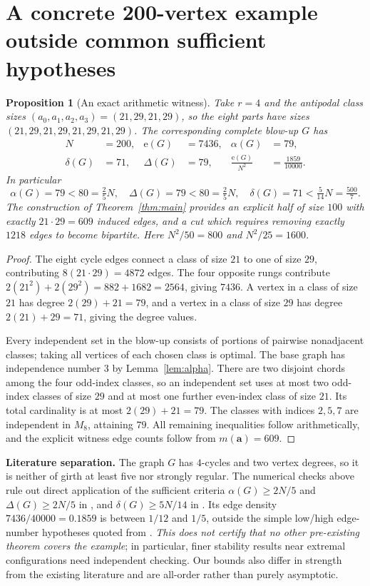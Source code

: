 \documentclass[11pt,a4paper]{article}
\newtheorem{proposition}[theorem]{Proposition}
\newcommand{\edges}{\mathrm e}
\begin{document}
\section{A concrete 200-vertex example outside common sufficient hypotheses}
\begin{proposition}[An exact arithmetic witness]\label{prop:200}
Take $r=4$ and the antipodal class sizes $(a_0,a_1,a_2,a_3)=(21,29,21,29)$, so the eight parts have sizes
$(21,29,21,29,21,29,21,29)$. The corresponding complete blow-up $G$ has
\begin{align*}
 N&=200,&\edges(G)&=7436, &\alpha(G)&=79,\\
 \delta(G)&=71, &\Delta(G)&=79, &\frac{\edges(G)}{N^2}&=\frac{1859}{10000}.
\end{align*}
In particular
\[
 \alpha(G)=79<80=\tfrac25N,\quad
 \Delta(G)=79<80=\tfrac25N,\quad
 \delta(G)=71<\tfrac5{14}N=\tfrac{500}{7}.
\]
The construction of Theorem~\ref{thm:main} provides an explicit half of size $100$ with \emph{exactly $21\cdot29=609$ induced edges}, and a cut which requires removing exactly $1218$ edges to become bipartite. Here $N^2/50=800$ and $N^2/25=1600$.
\end{proposition}
\begin{proof}
The eight cycle edges connect a class of size $21$ to one of size $29$, contributing $8(21\cdot29)=4872$ edges. The four opposite rungs contribute $2(21^2)+2(29^2)=882+1682=2564$, giving $7436$. A vertex in a class of size $21$ has degree $2(29)+21=79$, and a vertex in a class of size $29$ has degree $2(21)+29=71$, giving the degree values.

Every independent set in the blow-up consists of portions of pairwise nonadjacent classes; taking all vertices of each chosen class is optimal. The base graph has independence number $3$ by Lemma~\ref{lem:alpha}. There are two disjoint chords among the four odd-index classes, so an independent set uses at most two odd-index classes of size $29$ and at most one further even-index class of size $21$. Its total cardinality is at most $2(29)+21=79$. The classes with indices $2,5,7$ are independent in $M_8$, attaining $79$. All remaining inequalities follow arithmetically, and the explicit witness edge counts follow from $m(\mathbf a)=609$.
\end{proof}
\noindent\textbf{Literature separation.} The graph $G$ has $4$-cycles and two vertex degrees, so it is neither of girth at least five nor strongly regular. The numerical checks above rule out direct application of the sufficient criteria $\alpha(G)\ge2N/5$ and $\Delta(G)\ge2N/5$ in \cite{Raz2022}, and $\delta(G)\ge5N/14$ in \cite{NorYep2015}. Its edge density $7436/40000=0.1859$ is between $1/12$ and $1/5$, outside the simple low/high edge-number hypotheses quoted from \cite{KeeSud2006}. \emph{This does not certify that no other pre-existing theorem covers the example}; in particular, finer stability results near extremal configurations need independent checking. Our bounds also differ in strength from the existing literature and are all-order rather than purely asymptotic.
\end{document}
